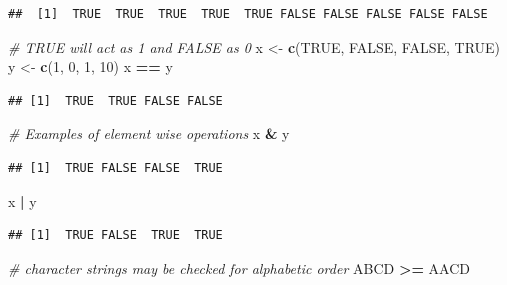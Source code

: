 \documentclass[
]{book}
\newenvironment{Shaded}{\begin{snugshade}}{\end{snugshade}}
\newcommand{\CommentTok}[1]{\textcolor[rgb]{0.56,0.35,0.01}{\textit{#1}}}
\newcommand{\ConstantTok}[1]{\textcolor[rgb]{0.56,0.35,0.01}{#1}}
\newcommand{\DecValTok}[1]{\textcolor[rgb]{0.00,0.00,0.81}{#1}}
\newcommand{\FunctionTok}[1]{\textcolor[rgb]{0.13,0.29,0.53}{\textbf{#1}}}
\newcommand{\NormalTok}[1]{#1}
\newcommand{\OtherTok}[1]{\textcolor[rgb]{0.56,0.35,0.01}{#1}}
\newcommand{\SpecialCharTok}[1]{\textcolor[rgb]{0.81,0.36,0.00}{\textbf{#1}}}
\newcommand{\StringTok}[1]{\textcolor[rgb]{0.31,0.60,0.02}{#1}}
\begin{document}
\begin{verbatim}
##  [1]  TRUE  TRUE  TRUE  TRUE  TRUE FALSE FALSE FALSE FALSE FALSE
\end{verbatim}

\begin{Shaded}
\begin{Highlighting}[]
\CommentTok{\# TRUE will act as 1 and FALSE as 0}
\NormalTok{x }\OtherTok{\textless{}{-}} \FunctionTok{c}\NormalTok{(}\ConstantTok{TRUE}\NormalTok{, }\ConstantTok{FALSE}\NormalTok{, }\ConstantTok{FALSE}\NormalTok{, }\ConstantTok{TRUE}\NormalTok{)}
\NormalTok{y }\OtherTok{\textless{}{-}} \FunctionTok{c}\NormalTok{(}\DecValTok{1}\NormalTok{, }\DecValTok{0}\NormalTok{, }\DecValTok{1}\NormalTok{, }\DecValTok{10}\NormalTok{)}
\NormalTok{x }\SpecialCharTok{==}\NormalTok{ y}
\end{Highlighting}
\end{Shaded}

\begin{verbatim}
## [1]  TRUE  TRUE FALSE FALSE
\end{verbatim}

\begin{Shaded}
\begin{Highlighting}[]
\CommentTok{\# Examples of element wise operations}
\NormalTok{x }\SpecialCharTok{\&}\NormalTok{ y}
\end{Highlighting}
\end{Shaded}

\begin{verbatim}
## [1]  TRUE FALSE FALSE  TRUE
\end{verbatim}

\begin{Shaded}
\begin{Highlighting}[]
\NormalTok{x }\SpecialCharTok{|}\NormalTok{ y}
\end{Highlighting}
\end{Shaded}

\begin{verbatim}
## [1]  TRUE FALSE  TRUE  TRUE
\end{verbatim}

\begin{Shaded}
\begin{Highlighting}[]
\CommentTok{\# character strings may be checked for alphabetic order}
\StringTok{\textquotesingle{}ABCD\textquotesingle{}} \SpecialCharTok{\textgreater{}=} \StringTok{\textquotesingle{}AACD\textquotesingle{}}
\end{Highlighting}
\end{Shaded}
\end{document}
